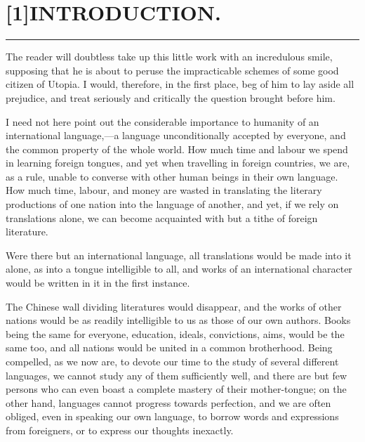 
\chapter*{\protect\scalebox{0.8}[1]{INTRODUCTION.}}
\fancyhead[C]{--- \thepage{} ---}

\begin{center}
\rule{5em}{0.4pt}
\end{center}

The reader will doubtless take up this little work with an incredulous smile, supposing that he is about to peruse the impracticable schemes of some good citizen of Utopia. I would, therefore, in the first place, beg of him to lay aside all prejudice, and treat seriously and critically the question brought before him. 

I need not here point out the considerable importance to humanity of an international language,---a language unconditionally accepted by everyone, and the common property of the whole world. How much time and labour we spend in learning foreign tongues, and yet when travelling in foreign countries, we are, as a rule, unable to converse with other human beings in their own language. How much time, labour, and money are wasted in translating the literary productions of one nation into the language of another, and yet, if we rely on translations alone, we can become acquainted with but a tithe of foreign literature.

Were there but an international language, all translations would be made into it alone, as into a tongue intelligible to all, and works of an international character would be written in it in the first instance.

The Chinese wall dividing literatures would disappear, and the works of other nations would be as readily intelligible to us as those of our own authors. Books being the same for everyone, education, ideals, convictions, aims, would be the same too, and all nations would be united in a common brotherhood. Being compelled, as we now are, to devote our time to the study of several different languages, we cannot study any of them sufficiently well, and there are but few persons who can even boast a complete mastery of their mother-tongue; on the other hand, languages cannot progress towards perfection, and we are often obliged, even in speaking our own language, to borrow words and expressions from foreigners, or to express our thoughts inexactly.

